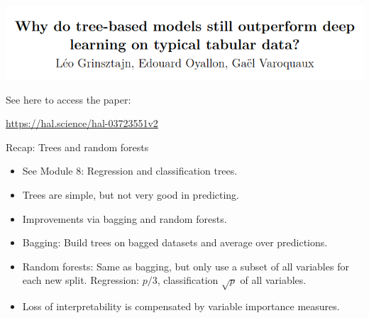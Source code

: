 \documentclass[
  10pt,
  ignorenonframetext,
]{beamer}
\providecommand{\tightlist}{%
  \setlength{\itemsep}{0pt}\setlength{\parskip}{0pt}}
\begin{document}
\begin{frame}
\includegraphics{graphics/why_outperform.png}

See here to access the paper:

\url{https://hal.science/hal-03723551v2}
\end{frame}

\begin{frame}
\begin{block}{Recap: Trees and random forests}
\label{recap-trees-and-random-forests}
\(~\)

\begin{itemize}
\tightlist
\item
  See Module 8: Regression and classification trees.
\end{itemize}

\vspace{2mm}

\begin{itemize}
\tightlist
\item
  Trees are simple, but not very good in predicting.
\end{itemize}

\vspace{2mm}

\begin{itemize}
\tightlist
\item
  Improvements via bagging and random forests.
\end{itemize}

\vspace{2mm}

\begin{itemize}
\tightlist
\item
  Bagging: Build trees on bagged datasets and average over predictions.
\end{itemize}

\vspace{2mm}

\begin{itemize}
\tightlist
\item
  Random forests: Same as bagging, but only use a subset of all
  variables for each new split. Regression: \(p/3\), classification
  \(\sqrt{p}\) of all variables.
\end{itemize}

\vspace{2mm}

\begin{itemize}
\tightlist
\item
  Loss of interpretability is compensated by variable importance
  measures.
\end{itemize}
\end{block}
\end{frame}
\end{document}
